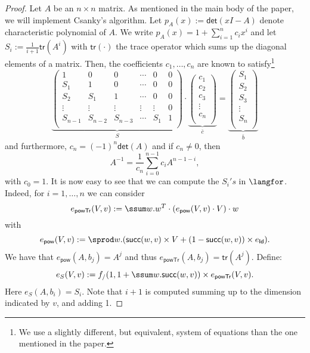 \begin{proof}
Let $A$ be an $n \times n$ matrix. As mentioned in the main body of the paper, we will implement Csanky's algorithm. Let $p_A(x):=\mathsf{det}(xI-A)$ denote  characteristic polynomial of $A$.  We write $p_A(x)=1 + \sum_{i=1}^n c_ix^i$ and let  $S_i:=\frac{1}{i+1}\mathsf{tr}(A^i)$ with $\mathsf{tr}(\cdot)$ the trace operator which sums up the diagonal elements of a matrix.
Then, the coefficients $c_1,\ldots,c_n$ are known to satisfy\footnote{We use a slightly different, but equivalent, system of equations than the one mentioned in the paper.} 
$$
\underbrace{\left(\begin{matrix}
1 & 0 & 0 & \cdots & 0 & 0\\
S_1 & 1 & 0 & \cdots  &0 & 0\\
S_2 & S_1 & 1 & \cdots  &0 & 0\\
\vdots & \vdots & \vdots & \vdots & \vdots & 0\\
S_{n-1} & S_{n-2} & S_{n-3} & \cdots & S_1 & 1\\
\end{matrix}\right)}_{S}\cdot
\underbrace{\left(\begin{matrix}
c_1\\
c_2\\
c_3\\
\vdots\\
c_n\\
\end{matrix}\right)}_{\bar c}=\underbrace{\left(\begin{matrix}
S_1\\
S_2\\
S_3\\
\vdots\\
S_n\\
\end{matrix}\right)}_{\bar b}
$$
and furthermore, $c_n=(-1)^n\mathsf{det}(A)$ and if $c_{n}\neq 0$, then
$$
A^{-1}=\frac{1}{c_n}\sum_{i=0}^{n-1}c_i A^{n-1-i},
$$
with $c_0=1$. It is now easy to see that we can compute the $S_i's$ in $\langfor$. Indeed, for
$i=1,\ldots,n$ we can consider
$$
e_{\mathsf{powTr}}(V,v):=\ssum w. w^T\cdot\left(e_{\mathsf{pow}}(V,v)\cdot V\right)\cdot w
$$
with 
$$
e_{\mathsf{pow}}(V,v):= \sprod w. (\mathsf{succ}(w,v)\times V+(1-\mathsf{succ}(w,v))\times e_{\mathsf{Id}}).
$$
We have that $e_{\mathsf{pow}}(A,b_j)=A^{j}$ and thus $e_{\mathsf{powTr}}(A,b_j)=\mathsf{tr}(A^{j})$. Define:
$$
e_{S}(V,v):=f_{/}(1, 1 + \ssum w. \mathsf{succ}(w,v))\times e_{\mathsf{powTr}}(V,v).
$$
Here $e_{S}(A,b_i)=S_i$. Note that $i+1$ is computed summing up to the dimension indicated by $v$, and adding 1.

\end{proof}
